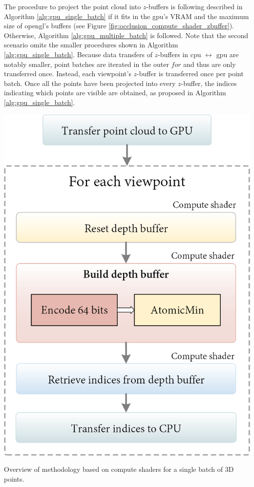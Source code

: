 The procedure to project the point cloud into $z$-buffers is following described in Algorithm \ref{alg:gpu_single_batch} if it fits in the \acrshort{gpu}'s VRAM and the maximum size of \acrshort{opengl}'s buffers (see Figure \ref{fig:occlusion_compute_shader_zbuffer}). Otherwise, Algorithm \ref{alg:gpu_multiple_batch} is followed. Note that the second scenario omits the smaller procedures shown in Algorithm \ref{alg:gpu_single_batch}. Because data transfers of $z$-buffers in \acrshort{cpu} $\leftrightarrow$ \acrshort{gpu} are notably smaller, point batches are iterated in the outer $\textit{for}$ and thus are only transferred once. Instead, each viewpoint's $z$-buffer is transferred once per point batch. Once all the points have been projected into every $z$-buffer, the indices indicating which points are visible are obtained, as proposed in Algorithm \ref{alg:gpu_single_batch}.
\begin{marginfigure}[.3cm]
    \includegraphics[width=\linewidth]{figs/multi_thermal_projection/occlusion_compute_shader.png}
    \caption{Overview of methodology based on compute shaders for a single batch of 3D points.}
    \label{fig:occlusion_compute_shader_zbuffer}
\end{marginfigure}

